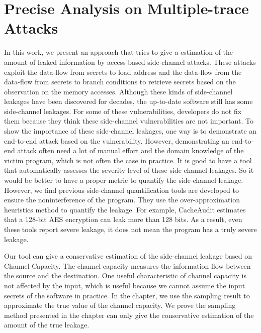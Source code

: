\section{Precise Analysis on Multiple-trace Attacks}
In this work, we present an approach that tries to give a 
estimation of the amount of leaked information by access-based
side-channel attacks. These attacks exploit the data-flow from secrets
to load address and the data-flow from the data-flow from secrets to
branch conditions to retrieve secrets based on the observation on the
memory accesses. Although these kinds of side-channel leakages have
been discovered for decades, the up-to-date software still has some
side-channel leakages. For some of these vulnerabilities, developers
do not fix them because they think these side-channel vulnerabilities
are not important. To show the importance of these side-channel
leakages, one way is to demonstrate an end-to-end attack based on the
vulnerability. However, demonstrating an end-to-end attack often need
a lot of manual effort and the domain knowledge of the victim program,
which is not often the case in practice. It is good to have a tool
that automatically assesses the severity level of these side-channel
leakages. So it would be better to have a proper metric to quantify
the side-channel leakage. However, we find previous side-channel
quantification tools are developed to ensure the noninterference of
the program. They use the over-approximation heuristics method to
quantify the leakage. For example, CacheAudit estimates that a 128-bit
AES encryption can leak more than 128 bits. As a result, even these
tools report severe leakage, it does not mean the program has a truly
severe leakage.

Our tool can give a conservative estimation of the
side-channel leakage based on Channel Capacity. The channel capacity
measures the information flow between the source and the
destination. One useful characteristic of channel capacity is not
affected by the input, which is useful because we cannot
assume the input secrets of the software in practice. In the chapter, we
use the sampling result to approximate the true value of the
channel capacity. We prove the sampling method presented in the chapter can only give the conservative estimation of the amount of the true leakage.


